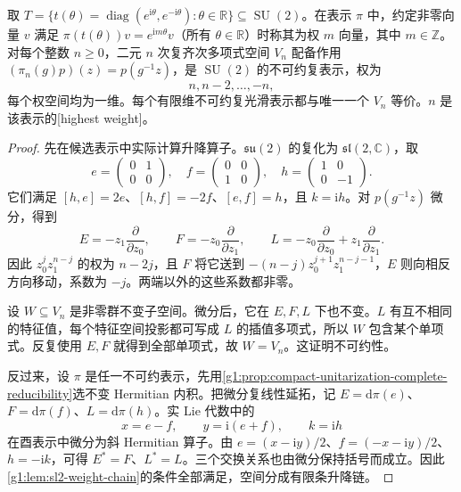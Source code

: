 \begin{theorem}\label{g1:thm:su2-polynomial-classification}
	取 \(T=\{t(\theta)=\operatorname{diag}(e^{\mathrm{i}\theta},e^{-\mathrm{i}\theta}):\theta\in\mathbb R\}\subseteq\operatorname{SU}(2)\)。在表示 \(\pi\) 中，约定非零向量 \(v\) 满足 \(\pi(t(\theta))v=e^{\mathrm{i}m\theta}v\)（所有 \(\theta\in\mathbb R\)）时称其为权 \(m\) 向量，其中 \(m\in\mathbb Z\)。对每个整数 \(n\ge0\)，二元 \(n\) 次复齐次多项式空间 \(V_n\) 配备作用 \((\pi_n(g)p)(z)=p(g^{-1}z)\)，是 \(\operatorname{SU}(2)\) 的不可约复表示，权为
	\[
		n,n-2,\ldots,-n,
	\]
	每个权空间均为一维。每个有限维不可约复光滑表示都与唯一一个 \(V_n\) 等价。\(n\) 是该表示的[highest weight]。
\end{theorem}
\begin{proof}
	先在候选表示中实际计算升降算子。\(\mathfrak{su}(2)\) 的复化为 \(\mathfrak{sl}(2,\mathbb C)\)，取
	\[
		e=\begin{pmatrix}0&1\\0&0\end{pmatrix},\quad
		f=\begin{pmatrix}0&0\\1&0\end{pmatrix},\quad
		h=\begin{pmatrix}1&0\\0&-1\end{pmatrix}.
	\]
	它们满足 \([h,e]=2e\)、\([h,f]=-2f\)、\([e,f]=h\)，且 \(k=\mathrm{i}h\)。对 \(p(g^{-1}z)\) 微分，得到
	\[
		E=-z_1\frac{\partial}{\partial z_0},\qquad
		F=-z_0\frac{\partial}{\partial z_1},\qquad
		L=-z_0\frac{\partial}{\partial z_0}+z_1\frac{\partial}{\partial z_1}.
	\]
	因此 \(z_0^jz_1^{n-j}\) 的权为 \(n-2j\)，且 \(F\) 将它送到 \(-(n-j)z_0^{j+1}z_1^{n-j-1}\)，\(E\) 则向相反方向移动，系数为 \(-j\)。两端以外的这些系数都非零。

	设 \(W\subseteq V_n\) 是非零群不变子空间。微分后，它在 \(E,F,L\) 下也不变。\(L\) 有互不相同的特征值，每个特征空间投影都可写成 \(L\) 的插值多项式，所以 \(W\) 包含某个单项式。反复使用 \(E,F\) 就得到全部单项式，故 \(W=V_n\)。这证明不可约性。

	反过来，设 \(\pi\) 是任一不可约表示，先用\cref{g1:prop:compact-unitarization-complete-reducibility}选不变 Hermitian 内积。把微分复线性延拓，记 \(E=\mathrm{d}\pi(e)\)、\(F=\mathrm{d}\pi(f)\)、\(L=\mathrm{d}\pi(h)\)。实 Lie 代数中的
	\[
		x=e-f,\qquad y=\mathrm{i}(e+f),\qquad k=\mathrm{i}h
	\]
	在酉表示中微分为斜 Hermitian 算子。由 \(e=(x-\mathrm{i}y)/2\)、\(f=(-x-\mathrm{i}y)/2\)、\(h=-\mathrm{i}k\)，可得 \(E^*=F\)、\(L^*=L\)。三个交换关系也由微分保持括号而成立。因此\cref{g1:lem:sl2-weight-chain}的条件全部满足，空间分成有限条升降链。


\end{proof}

